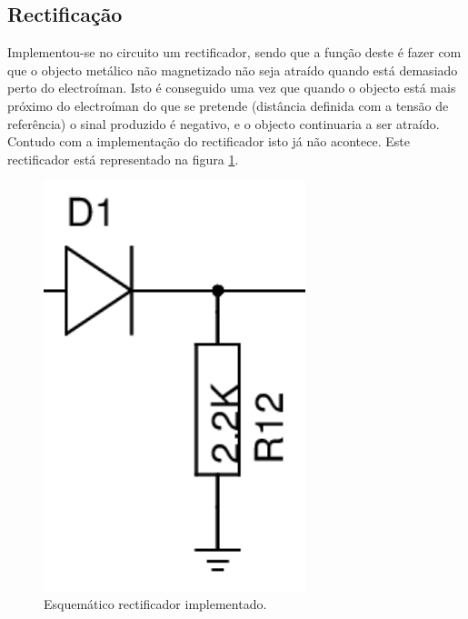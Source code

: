 \documentclass[%
  reprint,
  nofootinbib,
  amsmath,amssymb,
  aps,
  10pt,
  a4paper
]{revtex4-1}
\begin{document}
\subsection{Rectificação}
Implementou-se no circuito um rectificador, sendo que a função deste é fazer com que o objecto metálico não magnetizado não seja atraído quando está demasiado perto do electroíman. Isto é conseguido uma vez que quando o objecto está mais próximo do electroíman do que se pretende (distância definida com a tensão de referência) o sinal produzido é negativo, e o objecto continuaria a ser atraído. Contudo com a implementação do rectificador isto já não acontece. Este rectificador está representado na figura \ref{fig:rectificador}.
\begin{figure}[h]
\includegraphics[width=3in]{../img/rectificador.png}
\caption{Esquemático rectificador implementado.}
\label{fig:rectificador}
\end{figure}
\end{document}
